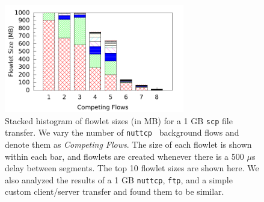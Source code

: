 \begin{figure}[!t]
        \centering
  \includegraphics[width=0.7\textwidth]{presto/figures/flowlets/histo.pdf}
        \caption{Stacked histogram of flowlet sizes (in MB) for a 1 GB {\tt scp} file transfer. We vary the number of {\tt nuttcp}~\cite{nuttcp} background flows and
                denote them as {\em Competing Flows}. The size of each flowlet is shown within each bar, and flowlets
                are created whenever there is a 500 $\mu$s delay between segments. The top 10 flowlet sizes are shown here.
                We also analyzed the results of a 1 GB {\tt nuttcp}, {\tt ftp}, and a simple custom client/server transfer and found them
                to be similar. }
        \label{micro_flowlet_size}
\end{figure}



